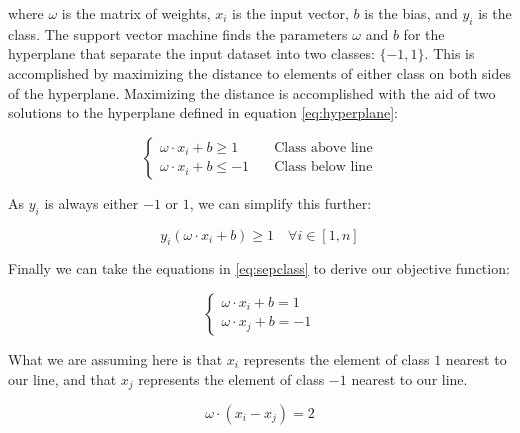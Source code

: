 \documentclass[a4paper]{comjnl}
\numberwithin{equation}{subsection}
\begin{document}
            \noindent where $\omega$ is the matrix of weights, $x_i$ is the input vector, $b$ is the
            bias, and $y_i$ is the class. The support vector machine finds the parameters $\omega$ and $b$ for the
            hyperplane that separate the input dataset into two classes: $\{-1,1\}$. This is accomplished by
            maximizing the distance to elements of either class on both sides of the hyperplane. Maximizing
            the distance is accomplished with the aid of two solutions to the hyperplane defined in
            equation \eqref{eq:hyperplane}:

            \begin{equation}\label{eq:sepclass}
                \begin{cases}
                    \omega \cdot x_i + b \geq 1 & \quad \text{Class above line} \\
                    \omega \cdot x_i + b \leq -1 & \quad \text{Class below line}
                \end{cases}
            \end{equation}

            \noindent As $y_i$ is always either $-1$ or $1$, we can simplify this further:

            \begin{equation}\label{eq:bothclass}
                y_i(\omega \cdot x_i + b) \geq 1 \quad \forall i \in [1,n]
            \end{equation}

            \noindent Finally we can take the equations in \eqref{eq:sepclass} to derive our
            objective function:

            \begin{equation*}
                \begin{cases}
                    \omega \cdot x_i + b = 1 \\
                    \omega \cdot x_j + b = -1
                \end{cases}
            \end{equation*}

            \noindent What we are assuming here is that $x_i$ represents the element of class $1$
            nearest to our line, and that $x_j$ represents the element of class $-1$ nearest to our
            line.

            \begin{equation*}
                \omega \cdot (x_i-x_j) = 2
            \end{equation*}
\end{document}
